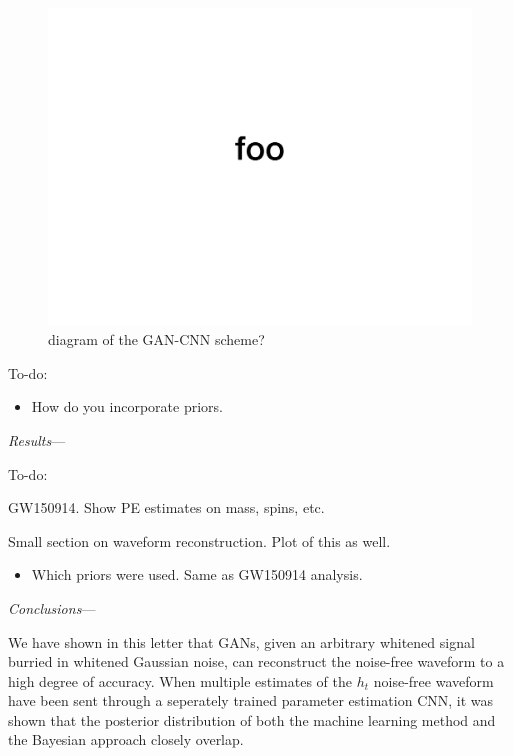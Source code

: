 \documentclass[%
showpacs,
 amsmath,amssymb,
 aps,
 twocolumn,
 prl,
 reprint,
floatfix,
]{revtex4-1}
\begin{document}
\begin{figure}
\includegraphics[draft,width=\columnwidth]{foo}
\caption{diagram of the GAN-CNN scheme?}
\end{figure}

To-do:

\begin{itemize}
\item How do you incorporate priors.
\end{itemize}

\textit{Results}---


To-do:

GW150914. Show PE estimates on mass, spins, etc.

Small section on waveform reconstruction. Plot of this as well.  

\begin{itemize}
\item Which priors were used. Same as GW150914 analysis.
\end{itemize}
\textit{Conclusions}---

We have shown in this letter that GANs, given an arbitrary whitened signal
burried in whitened Gaussian noise, can reconstruct the noise-free waveform to
a high degree of accuracy. When multiple estimates of the $h_t$ noise-free
waveform have been sent through a seperately trained parameter estimation CNN,
it was shown that the posterior distribution of both the machine learning
method and the Bayesian approach closely overlap.
\end{document}
